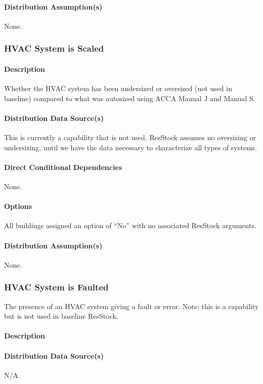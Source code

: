 \paragraph{Distribution Assumption(s)}
None.


\subsubsection{HVAC System is Scaled}

\paragraph{Description}
Whether the HVAC system has been undersized or oversized (not used in baseline) compared to what was autosized using ACCA Manual J and Manual S.
\paragraph{Distribution Data Source(s)}
This is currently a capability that is not used. ResStock assumes no oversizing or undersizing, until we have the data necessary to characterize all types of systems.
\paragraph{Direct Conditional Dependencies}
None.
\paragraph{Options}
All buildings assigned an option of ``No'' with no associated ResStock arguments.
\paragraph{Distribution Assumption(s)}
None.

\subsubsection{HVAC System is Faulted}
The presence of an HVAC system giving a fault or error. Note: this is a capability but is not used in baseline ResStock.
\paragraph{Description}
\paragraph{Distribution Data Source(s)}
N/A.
